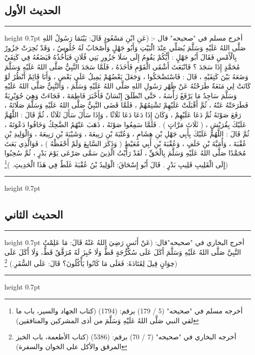 \documentclass[12pt,openany]{book}
\newenvironment{hadithblock}
  {\par\medskip\noindent\begin{minipage}{\linewidth}\hrule height 0.7pt \vspace{0.6em}\small}
  {\vspace{0.4em}\hrule height 0.7pt\end{minipage}\par\medskip}
\begin{document}
\subsection*{الحديث الأول}
\begin{hadithblock}
أخرج مسلم في "صحيحه" قال -: (عَنِ ابْنِ مَسْعُودٍ قَالَ: بَيْنَمَا رَسُولُ اللهِ صَلَّى اللهُ عَلَيْهِ وَسَلَّمَ يُصَلِّي عِنْدَ الْبَيْتِ وَأَبُو جَهْلٍ وَأَصْحَابٌ لَهُ جُلُوسٌ ، وَقَدْ نُحِرَتْ جَزُورٌ بِالْأَمْسِ فَقَالَ أَبُو جَهْلٍ : أَيُّكُمْ يَقُومُ إِلَى سَلَا جَزُورِ بَنِي فُلَانٍ فَيَأْخُذُهُ فَيَضَعُهُ فِي كَتِفَيْ مُحَمَّدٍ إِذَا سَجَدَ ؟ فَانْبَعَثَ أَشْقَى الْقَوْمِ فَأَخَذَهُ ، فَلَمَّا سَجَدَ النَّبِيُّ صَلَّى اللهُ عَلَيْهِ وَسَلَّمَ وَضَعَهُ بَيْنَ كَتِفَيْهِ ، قَالَ : فَاسْتَضْحَكُوا ، وَجَعَلَ بَعْضُهُمْ يَمِيلُ عَلَى بَعْضٍ ، وَأَنَا قَائِمٌ أَنْظُرُ لَوْ كَانَتْ لِي مَنَعَةٌ طَرَحْتُهُ عَنْ ظَهْرِ رَسُولِ اللهِ صَلَّى اللهُ عَلَيْهِ وَسَلَّمَ ، وَالنَّبِيُّ صَلَّى اللهُ عَلَيْهِ وَسَلَّمَ سَاجِدٌ مَا يَرْفَعُ رَأْسَهُ ، حَتَّى انْطَلَقَ إِنْسَانٌ فَأَخْبَرَ فَاطِمَةَ ، فَجَاءَتْ وَهِيَ جُوَيْرِيَةٌ فَطَرَحَتْهُ عَنْهُ ، ثُمَّ أَقْبَلَتْ عَلَيْهِمْ تَشْتِمُهُمْ ، فَلَمَّا قَضَى النَّبِيُّ صَلَّى اللهُ عَلَيْهِ وَسَلَّمَ صَلَاتَهُ ، رَفَعَ صَوْتَهُ ثُمَّ دَعَا عَلَيْهِمْ ، وَكَانَ إِذَا دَعَا دَعَا ثَلَاثًا ، وَإِذَا سَأَلَ سَأَلَ ثَلَاثًا ، ثُمَّ قَالَ : اللَّهُمَّ عَلَيْكَ بِقُرَيْشٍ ، ( ثَلَاثَ مَرَّاتٍ ) . فَلَمَّا سَمِعُوا صَوْتَهُ ، ذَهَبَ عَنْهُمُ الضَّحِكُ وَخَافُوا دَعْوَتَهُ ، ثُمَّ قَالَ : اللَّهُمَّ عَلَيْكَ بِأَبِي جَهْلِ بْنِ هِشَامٍ ، وَعُتْبَةَ بْنِ رَبِيعَةَ ، وَشَيْبَةَ بْنِ رَبِيعَةَ ، وَالْوَلِيدِ بْنِ عُقْبَةَ ، وَأُمَيَّةَ بْنِ خَلَفٍ ، وَعُقْبَةَ بْنِ أَبِي مُعَيْطٍ ( وَذَكَرَ السَّابِعَ وَلَمْ أَحْفَظْهُ ) ، فَوَالَّذِي بَعَثَ مُحَمَّدًا صَلَّى اللهُ عَلَيْهِ وَسَلَّمَ بِالْحَقِّ ، لَقَدْ رَأَيْتُ الَّذِينَ سَمَّى صَرْعَى يَوْمَ بَدْرٍ ، ثُمَّ سُحِبُوا إِلَى الْقَلِيبِ قَلِيبِ بَدْرٍ . قَالَ أَبُو إِسْحَاقَ: الْوَلِيدُ بْنُ عُقْبَةَ غَلَطٌ فِي هَذَا الْحَدِيثِ. )\footnote{أخرجه مسلم في "صحيحه" (5 / 179) برقم: (1794) (كتاب الجهاد والسير، باب ما لقي النبي صَلَّى اللهُ عَلَيْهِ وَسَلَّمَ من أذى المشركين والمنافقين)})
\end{hadithblock}

\subsection*{الحديث الثاني}
\begin{hadithblock}
أخرج البخاري في "صحيحه"قال: (عَنْ أَنَسٍ رَضِيَ اللهُ عَنْهُ قَالَ: مَا عَلِمْتُ النَّبِيَّ صَلَّى اللهُ عَلَيْهِ وَسَلَّمَ أَكَلَ عَلَى سُكُرُّجَةٍ قَطُّ وَلَا خُبِزَ لَهُ مُرَقَّقٌ قَطُّ، وَلَا أَكَلَ عَلَى خِوَانٍ قِيلَ لِقَتَادَةَ: فَعَلَى مَا كَانُوا يَأْكُلُونَ؟ قَالَ: عَلَى السُّفَرِ.) \footnote{أخرجه البخاري في "صحيحه" (7 / 70) برقم: (5386) (كتاب الأطعمة، باب الخبز المرقق والأكل على الخوان والسفرة)})
\end{hadithblock}
\end{document}
